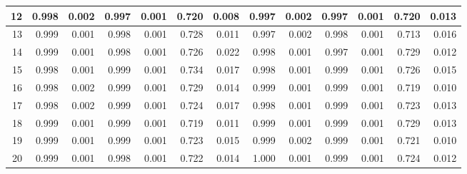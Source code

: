 \documentclass[
]{article}
\begin{document}
\begin{table}[H]
{\begin{tabular}[t]{r|r|r|r|r|r|r|r|r|r|r|r|r}
\hline
12 & 0.998 & 0.002 & 0.997 & 0.001 & 0.720 & 0.008 & 0.997 & 0.002 & 0.997 & 0.001 & 0.720 & 0.013\\
\hline
13 & 0.999 & 0.001 & 0.998 & 0.001 & 0.728 & 0.011 & 0.997 & 0.002 & 0.998 & 0.001 & 0.713 & 0.016\\
\hline
14 & 0.999 & 0.001 & 0.998 & 0.001 & 0.726 & 0.022 & 0.998 & 0.001 & 0.997 & 0.001 & 0.729 & 0.012\\
\hline
15 & 0.998 & 0.001 & 0.999 & 0.001 & 0.734 & 0.017 & 0.998 & 0.001 & 0.999 & 0.001 & 0.726 & 0.015\\
\hline
16 & 0.998 & 0.002 & 0.999 & 0.001 & 0.729 & 0.014 & 0.999 & 0.001 & 0.999 & 0.001 & 0.719 & 0.010\\
\hline
17 & 0.998 & 0.002 & 0.999 & 0.001 & 0.724 & 0.017 & 0.998 & 0.001 & 0.999 & 0.001 & 0.723 & 0.013\\
\hline
18 & 0.999 & 0.001 & 0.999 & 0.001 & 0.719 & 0.011 & 0.999 & 0.001 & 0.999 & 0.001 & 0.729 & 0.013\\
\hline
19 & 0.999 & 0.001 & 0.999 & 0.001 & 0.723 & 0.015 & 0.999 & 0.002 & 0.999 & 0.001 & 0.721 & 0.010\\
\hline
20 & 0.999 & 0.001 & 0.998 & 0.001 & 0.722 & 0.014 & 1.000 & 0.001 & 0.999 & 0.001 & 0.724 & 0.012\\
\hline
\end{tabular}}
\end{table}
\end{document}
